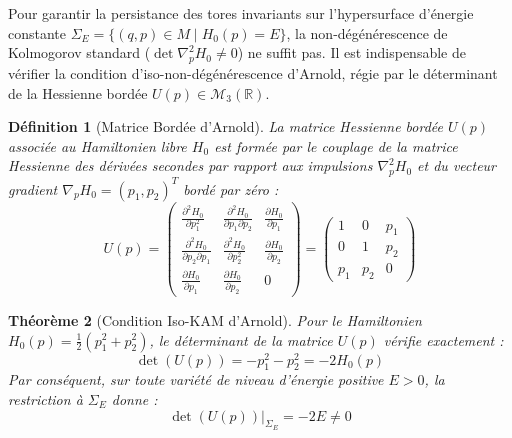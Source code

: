 \documentclass[10pt,twocolumn,a4paper]{article}
\newtheorem{theorem}{Théorème}[section]
\newtheorem{definition}[theorem]{Définition}
\begin{document}
Pour garantir la persistance des tores invariants sur l'hypersurface d'énergie constante $\Sigma_E = \{ (q,p) \in M \mid H_0(p) = E \}$, la non-dégénérescence de Kolmogorov standard ($\det \nabla_p^2 H_0 \neq 0$) ne suffit pas. Il est indispensable de vérifier la condition d'iso-non-dégénérescence d'Arnold, régie par le déterminant de la Hessienne bordée $U(p) \in \mathcal{M}_3(\mathbb{R})$.

\begin{definition}[Matrice Bordée d'Arnold]
La matrice Hessienne bordée $U(p)$ associée au Hamiltonien libre $H_0$ est formée par le couplage de la matrice Hessienne des dérivées secondes par rapport aux impulsions $\nabla_p^2 H_0$ et du vecteur gradient $\nabla_p H_0 = (p_1, p_2)^T$ bordé par zéro :
\begin{equation}
U(p) = \begin{pmatrix} 
\frac{\partial^2 H_0}{\partial p_1^2} & \frac{\partial^2 H_0}{\partial p_1 \partial p_2} & \frac{\partial H_0}{\partial p_1} \\[6pt] 
\frac{\partial^2 H_0}{\partial p_2 \partial p_1} & \frac{\partial^2 H_0}{\partial p_2^2} & \frac{\partial H_0}{\partial p_2} \\[6pt] 
\frac{\partial H_0}{\partial p_1} & \frac{\partial H_0}{\partial p_2} & 0 
\end{pmatrix} = \begin{pmatrix} 1 & 0 & p_1 \\ 0 & 1 & p_2 \\ p_1 & p_2 & 0 \end{pmatrix}
\end{equation}
\end{definition}

\begin{theorem}[Condition Iso-KAM d'Arnold]
Pour le Hamiltonien $H_0(p) = \frac{1}{2}(p_1^2 + p_2^2)$, le déterminant de la matrice $U(p)$ vérifie exactement :
\begin{equation}
\det(U(p)) = -p_1^2 - p_2^2 = -2 H_0(p)
\end{equation}
Par conséquent, sur toute variété de niveau d'énergie positive $E > 0$, la restriction à $\Sigma_E$ donne :
\begin{equation}
\det(U(p))\Big|_{\Sigma_E} = -2E \neq 0
\end{equation}
\end{theorem}
\end{document}
